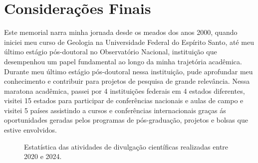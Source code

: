 \documentclass[10pt,a4paper,oneside]{book}
\begin{document}

\chapter{Considerações Finais}
\label{cap_conclusao}

Este memorial narra minha jornada desde os meados dos anos 2000, quando iniciei meu curso de Geologia na Universidade Federal do Espírito Santo, até meu último estágio pós-doutoral no Observatório Nacional, instituição que desempenhou um papel fundamental ao longo da minha trajetória acadêmica. Durante meu último estágio pós-doutoral nessa instituição, pude aprofundar meu conhecimento e contribuir para projetos de pesquisa de grande relevância. Nessa maratona acadêmica, passei por 4 instituições federais em 4 estados diferentes, visitei 15 estados para participar de conferências nacionais e aulas de campo e visitei 5 países assistindo a cursos e conferências internacionais graças ás oportunidades geradas pelos programas de pós-graduação, projetos e bolsas que estive envolvidos.

\begin{figure}
	\centering
	\caption{Estatística das atividades de divulgação científicas realizadas entre 2020 e 2024.}
	\label{fig_resumo_divulgacao}
\end{figure}
\end{document}
